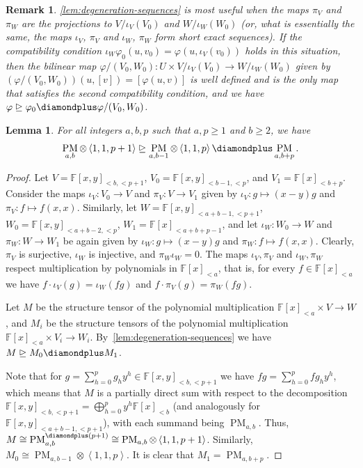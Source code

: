 \documentclass[11pt,letterpaper]{article}
\newtheorem{lemma}[theorem]{Lemma}\AddToHook{env/lemma/begin}{\crefalias{theorem}{lemma}}
\newtheorem{remark}[theorem]{Remark}\AddToHook{env/remark/begin}{\crefalias{theorem}{remark}}
\numberwithin{equation}{section}
\newcommand{\FF}{\mathbb{F}}
\DeclareMathOperator{\PM}{PM}
\begin{document}
\begin{remark}\label{rem:quotient-degeneration}
  \cref{lem:degeneration-sequences} is most useful when the maps $\pi_V$ and $\pi_W$ are the projections to $V/\iota_V(V_0)$ and $W/\iota_W(W_0)$ (or, what is essentially the same, the maps $\iota_V$, $\pi_V$ and $\iota_W$, $\pi_W$ form short exact sequences). If the compatibility condition $\iota_W \varphi_0(u, v_0) = \varphi(u, \iota_V(v_0))$ holds in this situation, then the bilinear map $\varphi/(V_0, W_0) \colon U \times V/\iota_V(V_0) \to W/\iota_W(W_0)$ given by $(\varphi/(V_0,W_0))(u, [v]) = [\varphi(u, v)]$ is well defined and is the only map that satisfies the second compatibility condition, and we have $\varphi \trianglerighteq \varphi_0 \diamondplus \varphi/(V_0, W_0)$.
\end{remark}

\begin{lemma}\label{lem:pm-concavity-degeneration}
    For all integers $a,b,p$ such that $a, p \geq 1$ and $b \geq 2$, we have
    \[ \PM_{a, b} \otimes \left<1,1,p + 1\right> \trianglerighteq \PM_{a, b - 1} \otimes \left<1,1,p\right> \diamondplus \PM_{a, b + p}. \]
\end{lemma}
\begin{proof}
    Let $V = \FF[x, y]_{<b, < p + 1}$, $V_0 = \FF[x, y]_{< b - 1, < p}$, and $V_1 = \FF[x]_{< b + p}$.
    Consider the maps $\iota_V \colon V_0 \to V$ and $\pi_V \colon V \to V_1$ given by $\iota_V \colon g \mapsto (x - y) g$ and $\pi_V \colon f \mapsto f(x, x)$.
    Similarly, let $W = \FF[x, y]_{< a + b - 1, < p + 1}$, $W_0 = \FF[x, y]_{< a + b - 2, < p}$, $W_1 = \FF[x]_{< a + b + p  - 1}$, and let $\iota_W \colon W_0 \to W$ and $\pi_W \colon W \to W_1$ be again given by $\iota_W \colon g \mapsto (x - y) g$ and $\pi_W \colon f \mapsto f(x, x)$.
    Clearly, $\pi_V$ is surjective, $\iota_W$ is injective, and $\pi_W \iota_W = 0$.
    The maps $\iota_V, \pi_V$ and $\iota_W, \pi_W$ respect multiplication by polynomials in $\FF[x]_{< a}$, that is, for every $f \in \FF[x]_{< a}$ we have $f \cdot \iota_V(g) = \iota_W(fg)$ and $f \cdot \pi_V(g) = \pi_W(fg)$.

    Let $M$ be the structure tensor of the polynomial multiplication $\FF[x]_{< a} \times V \to W$, and $M_i$ be the structure tensors of the polynomial multiplication $\FF[x]_{< a} \times V_i \to W_i$. By~\cref{lem:degeneration-sequences} we have $M \trianglerighteq M_0 \diamondplus M_1$.

    Note that for $g = \sum_{h = 0}^{p} g_h y^h \in \FF[x, y]_{<b, <p + 1}$ we have $fg = \sum_{h = 0}^p fg_h y^h$, which means that $M$ is a partially direct sum with respect to the decomposition $\FF[x, y]_{< b, < p + 1} = \bigoplus_{h = 0}^p y^h \FF[x]_{< b}$ (and analogously for $\FF[x, y]_{<a + b - 1, <p + 1}$), with each summand being $\PM_{a, b}$. Thus, $M \cong \PM_{a, b}^{\diamondplus (p + 1)} \cong \PM_{a, b} \otimes \left<1,1,p + 1\right>$.
    Similarly, $M_0 \cong \PM_{a, b - 1} \otimes \left<1,1,p\right>$.
    It is clear that $M_1 = \PM_{a, b + p}$.
\end{proof}
\end{document}
